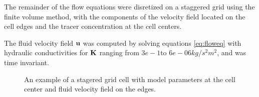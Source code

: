 \documentclass[12pt]{article}
\newcommand{\bfK}	{{\bf{K}}}
\newcommand{\bfm}	{{\bf{m}}}
\newcommand{\bfu}	{{\bf{u}}}
\begin{document}
The remainder of the flow equations were disretized on a staggered grid using the finite volume method, with the components of the velocity field located on the cell edges and the tracer concentration at the cell centers. 

The  fluid velocity field $\bfu$ was  computed by solving equations \eqref{eq:floweq} with hydraulic conductivities for $\bfK$ ranging from $3e-1 \text{to } 6e-06 kg/s^2m^2$, and was time invariant. 


\begin{figure}[!h]
\label{fig:cell}
\begin{center}
\caption{An example of a stagered grid cell with model parameters at the cell center and fluid velocity field on the edges. \label{fig:stag}}
\end{center}
\end{figure}
 
\end{document}
